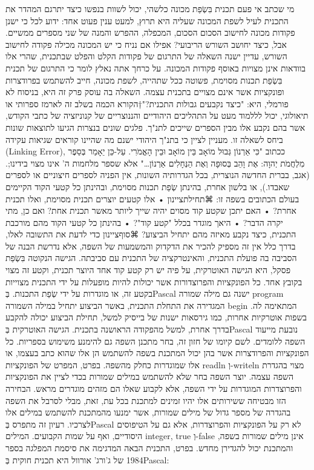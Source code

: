מי שכתב אי פעם תכנית בִּשְׂפַת מכונה כלשהי, יכול לשוות בנפשו כיצד יתרגם המהדר את
התכנית לעיל לשפת המכונה שעליה היא תרוץ, למעט ענין פעוט אחד: ידוע לכל כי ישנן
פקודות מכונה לחישוב הסכום הסכום, המכפלה, ההפרש והמנה של שני מספרים ממשיים. אבל,
כיצד יחושב השורש הריבועי? אפילו אם נניח כי יש המכונה מכילה פקודה לחישוב השורש,
עדיין ישנה השאלה של התרגום של פקודות הקלט והפלט שבתכנית, שהרי אלו בוודאות אינן
מצויות באוסף פקודות המכונה. על כרחך אתה נאלץ לומר כי התרגום של תכנית בִּשְׂפַת
תכנות מסוימת, פשוטה ככל שתהייה, לשפת מכונה, חייב להשתמש בפרודצרות ופונקציות אשר
אינם מצויים בתכנית עצמה. השאלה בה עוסק פרק זה היא, בניסוח לא פורמלי, היא: "כיצד
נקבעים גבולות התכנית?"†{הקורא הכמה בשלב זה לארמז ספרותי או תיאולוגי, יכול לללמוד מעט על התהליכים היהודיים והננוצריים של קנוניזציה של כתבי הקודש, אשר בהם נקבע אלו מבין הספרים שייכים לתנ"ך. פלגים שונים בנצרות הגיעו לתוצאות שונות ביחס לשאלה זו. מעניין לציין כי בתנ"ך היהודי ישנם מה שהיינו קוראים שגיאות עקידה (Linking Error), ככתוב "כִּי אַרְנוֹן גְּבוּל מוֹאָב בֵּין מוֹאָב וּבֵין הָאֱמֹרִי. עַל-כֵּן יֵאָמַר בְּסֵפֶר מִלְחֲמֹת יְהוָה: אֶת וָהֵב בְּסוּפָה וְאֶת הַנְּחָלִים אַרְנוֹן…" אלא שספר מלחמות ה' אינו מצוי בידינו;. (אגב, בברית החדשה הנוצרית, בכל הגדרותיה השונות, אין הפניה לספרים חיצוניים או לספרים שאבדו.)}, או בלשון אחרת, בהינתן שְׂפַת תכנות מסוימת, ובהינתן כל
    קטעי הקוד הקיימים בעולם הכתובים בשפה זו:
 ⌘תחילת{ציינון}
         • אלו קטעים יוצרים תכנית מסוימת, ואלו תכנית אחרת?
        • האם יתכן שקטע קוד מסוים יהיה שייך ליותר מאשר תכנית אחת? ואם כן, מתי יקרה הדבר?
        • היאך מוגדר בכלל "קטע קוד"?
        • בהינתן כל קטעי הקוד מהם מורכבת התכנית, כיצד נקבע מאיזה מהם יתחיל הביצוע?
        ⌘סוף{ציינון}
        כדי לדעת את התשובה לאלו, בדרך כלל אין זה מספיק להכיר את הדקדוק והמשמעות של
        השפה, אלא נדרשת הבנה של הסביבה בה פועלת התכנית, והאינטרקציה של התכנית עם
        סביבתה. הגישה הנקוטה בִּשְׂפַת פסקל, היא הגישה האוטרקית, על פיה יש רק קטע קוד אחד
        היוצר תכנית, וקטע זה מצוי בקובץ אחד. כל הפונקציות והפרוצדורות אשר יכולות להיות
        מופעלות על ידי התכנית מצוייות בקטע זה, או מוגדרות על ידי שְׂפַת התכנות.
        בְּPascal ישנה גם מילה שמורה program המגדירה את התחלת התכנית, באשר הביצוע יתחיל במילה השמורה begin המתאימה לה. בשפות אוטרקיות אחרות, כמו גירסאות ישנות של בייסיק למשל, תחילת הביצוע יכולה להקבע בדרך אחרת, למשל מהפקודה הראושנה בתכנית.
        הגישה האוטרקית בְּPascal נובעת מייעוד השפה ללומדים. לשם קיומו של חזון זה, בחר
        מתכנן השפה גם להימנע משימוש בספריות. כל הפונקציות והפרודצרות אשר בהן יכול
        המתכנת בשפה להשתמש הן אלו שהוא כתב בעצמו, או אלו שמוגדרות כחלק מהשפה. בפרט,
המפרט של הפונקציות readln וְ-writeln מצוי בהגדרת השפה עצמה. יוצר השפה בחר שלא
להשתמש במילים שמורות בכדי לציין את הפונקציות והפרוצדרות המוגדרות על ידי השפה,
אלא לקבוע שאלו הם מזהים מוגדרים מראש. הבחירה הזו מבטיחה ששירותים אלו יהיו
זמינים למתכנת בכל עת, זאת, מבלי לסרבל את השפה בהגדרה של מספר גדול של מילים
שמורות, אשר ימנעו מהמתכנת להשתמש במילים אלו לצרכיו. רעיון זה מתפרס בְּPascal לא
רק על הפונקציות והפרוצדרות, אלא גם על הטיפוסים היסודיים, ואף על שמות הקבועים.
המילים integer, true וְ-false אינן מילים שמורות בשפה, והמתכנת יכול להגדירן מחדש.
בפרט, התכנית הבאה המדגימה את סיסמת המפלגה בספר 1984 של ג'ורג' אורוול היא תכנית
חוקית בְּPascal:

